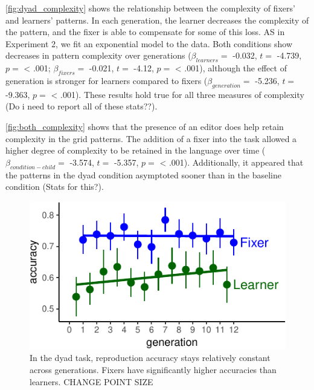 \documentclass[10pt, letterpaper]{article}
\newenvironment{CodeChunk}{}{}
\begin{document}
\ref{fig:dyad_complexity} shows the relationship between the complexity
of fixers' and learners' patterns. In each generation, the learner
decreases the complexity of the pattern, and the fixer is able to
compensate for some of this loss. AS in Experiment 2, we fit an
exponential model to the data. Both conditions show decreases in pattern
complexity over generations (\(\beta_{learners} =\) -0.032, \(t =\)
-4.739, \(p =\) \textless{} .001; \(\beta_{fixers} =\) -0.021, \(t =\)
-4.12, \(p =\) \textless{} .001), although the effect of generation is
stronger for learners compared to fixers (\(\beta_{generation} =\)
-5.236, \(t =\) -9.363, \(p =\) \textless{} .001). These results hold
true for all three measures of complexity (Do i need to report all of
these stats??).

\ref{fig:both_complexity} shows that the presence of an editor does help
retain complexity in the grid patterns. The addition of a fixer into the
task allowed a higher degree of complexity to be retained in the
language over time (\(\beta_{condition-child} =\) -3.574, \(t =\)
-5.357, \(p =\) \textless{} .001). Additionally, it appeared that the
patterns in the dyad condition asymptoted sooner than in the baseline
condition (Stats for this?).

\begin{CodeChunk}
\begin{figure}[tb]

{\centering \includegraphics{figs/dyad_accuracy-1} 

}

\caption[In the dyad task, reproduction accuracy stays relatively constant across generations]{In the dyad task, reproduction accuracy stays relatively constant across generations. Fixers have significantly higher accuracies than learners. CHANGE POINT SIZE}\label{fig:dyad_accuracy}
\end{figure}
\end{CodeChunk}
\end{document}
